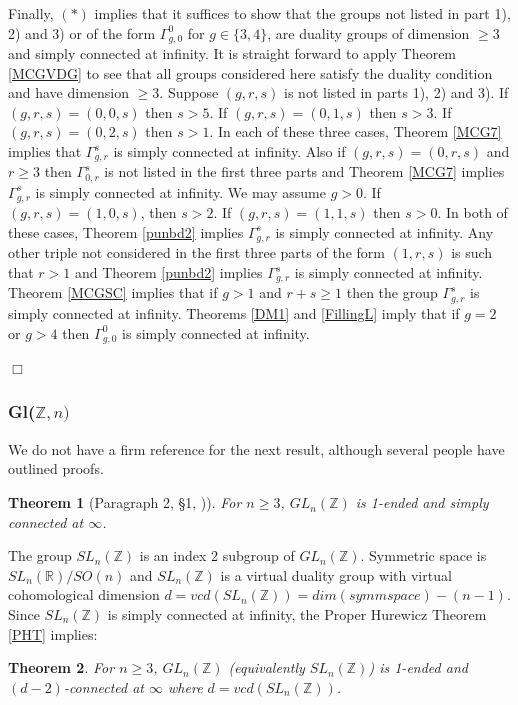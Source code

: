 \documentclass[12pt]{article}
\newtheorem{theorem}{Theorem}[subsection]
\newenvironment{proof}{\addvspace{12pt}\noindent{\bf Proof:}}{
$\Box$\par\addvspace{12pt}}
\begin{document}
\begin{proof}
Finally, $(\ast)$ implies that it suffices to show that the groups not listed in part 1), 2) and 3) or of the form $\Gamma_{g,0}^0$ for $g\in \{3,4\}$, are duality groups of dimension $\geq 3$ and simply connected at infinity. It is straight forward to apply Theorem \ref{MCGVDG} to see that all groups considered here satisfy the duality condition and have dimension $\geq 3$.
 Suppose $(g,r,s)$ is not listed in parts 1), 2) and 3). If $(g,r,s)=(0,0,s)$ then $s>5$. If $(g,r,s)=(0,1,s)$ then $s>3$. If $(g,r,s)=(0,2,s)$ then $s>1$. In each of these three cases, Theorem \ref{MCG7} implies that $\Gamma_{g,r}^s$ is simply connected at infinity. Also if $(g,r,s)=(0,r,s)$ and $r\geq 3$ then $\Gamma_{0,r}^s$ is not listed in the first three parts and Theorem \ref{MCG7} implies $\Gamma_{g,r}^s$ is simply connected at infinity. We may assume $g>0$. If $(g,r,s)=(1,0,s)$, then $s>2$. If $(g,r,s)=(1,1,s)$ then $s>0$. In both of these cases, Theorem \ref{punbd2} implies $\Gamma_{g,r}^s$ is simply connected at infinity. Any other triple not considered in the first three parts of the form $(1,r,s)$ is such that $r>1$ and Theorem \ref{punbd2} implies $\Gamma_{g,r}^s$ is simply connected at infinity. Theorem \ref{MCGSC} implies that if $g>1$ and $r+s\geq 1$ then the group $\Gamma_{g,r}^s$ is simply connected at infinity. Theorems \ref{DM1} and \ref{FillingL} imply that if $g=2$ or $g>4$ then $\Gamma_{g,0}^0$ is simply connected at infinity. 
 \end{proof}
 
\subsubsection{Gl($\mathbb Z,n)$}\label{GLNZ}
 We do not have a firm reference for the next result, although several people have outlined proofs. 
 
\begin{theorem} [Paragraph 2, \S 1, \cite{Vo95})] \label{GLNZSC}
For $n\geq 3$, $GL_n(\mathbb Z)$ is 1-ended and simply connected at $\infty$. 
\end{theorem}

The group $SL_n(\mathbb Z)$ is an index 2 subgroup of $GL_n(\mathbb Z)$. Symmetric space is $SL_n(\mathbb R)/SO(n)$ and $SL_n(\mathbb Z)$ is a virtual duality group with virtual cohomological dimension $d=vcd(SL_n(\mathbb Z))=dim(symm space)-(n-1)$. Since $SL_n(\mathbb Z)$ is simply connected at infinity, the Proper Hurewicz Theorem \ref{PHT} implies:

\begin{theorem}
For $n\geq 3$, $GL_n(\mathbb Z)$ (equivalently $SL_n(\mathbb Z)$) is 1-ended and $(d-2)$-connected at $\infty$ where $d=vcd(SL_n(\mathbb Z))$.
\end{theorem}
\end{document}
